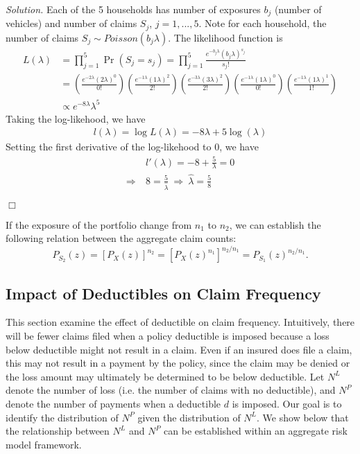 \documentclass[12pt,letterpaper]{article}
\begin{document}
\bigskip

\noindent \textit{Solution.} Each of the 5 households has number of exposures $b_j$ (number of vehicles) and number of claims $S_j$, $j=1,...,5$. Note for each household, the number of claims $S_j \sim Poisson (b_j \lambda)$. The likelihood function is
\begin{align*}
L(\lambda) &= \prod_{j=1}^5 \Pr(S_j=s_j) = \prod_{j=1}^5 \frac{e^{-b_j\lambda} (b_j \lambda)^{s_j}}{s_j!} \\
&= \left(\frac{e^{-2\lambda} (2 \lambda)^{0}}{0!} \right)
\left(\frac{e^{-1\lambda} (1 \lambda)^{2}}{2!} \right)
\left(\frac{e^{-3\lambda} (3 \lambda)^{2}}{2!} \right)
\left(\frac{e^{-1\lambda} (1 \lambda)^{0}}{0!} \right)
\left(\frac{e^{-1\lambda} (1 \lambda)^{1}}{1!} \right) \\
&\propto e^{-8\lambda} \lambda^5
\end{align*}
Taking the log-likehood, we have
\begin{align*}
l(\lambda) = \log L(\lambda) = -8\lambda + 5\log(\lambda)
\end{align*}
Setting the first derivative of the log-likehood to 0, we have
\begin{align*}
&l'(\lambda) = -8 + \frac{5}{\lambda} = 0 \\
\Rightarrow \ & 8 = \frac{5}{\hat{\lambda}} \ \Rightarrow \ \hat{\lambda} = \frac{5}{8}
\end{align*}

\begin{flushright}$\Box$\end{flushright}

If the exposure of the portfolio change from $n_1$ to $n_2$, we can establish the following relation between the aggregate claim counts:
$$P_{S_2}(z)=[P_X(z)]^{n_2}=[P_X(z)^{n_1}]^{n_2/n_1}=P_{S_1}(z)^{n_2/n_1}.$$

\subsection{Impact of Deductibles on Claim Frequency}

This section examine the effect of deductible on claim frequency. Intuitively, there will be fewer claims filed when a policy deductible is imposed because a loss below deductible might not result in a claim. Even if an insured does file a claim, this may not result in a payment by the policy, since the claim may be denied or the loss amount may ultimately be determined to be below deductible. Let $N^L$ denote the number of loss (i.e. the number of claims with no deductible), and $N^P$ denote the number of payments when a deductible $d$ is imposed. Our goal is to identify the distribution of $N^P$ given the distribution of $N^L$.  We show below that the relationship between $N^L$ and $N^P$ can be established within an aggregate risk model framework.
\end{document}
